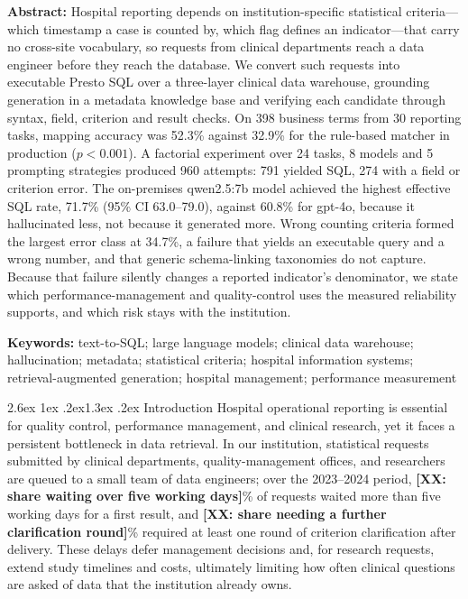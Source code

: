 \documentclass[10pt]{article}
\makeatletter
\renewcommand\section{\@startsection{section}{1}{\z@}%
  {2.6ex \@plus 1ex \@minus .2ex}{1.3ex \@plus .2ex}%
  {\normalfont\large\bfseries}}
\newcommand{\PH}[1]{{\color{red}\textbf{[#1]}}}
\makeatother
\begin{document}
\vspace{9pt}
\noindent\textbf{Abstract:}
Hospital reporting depends on institution-specific statistical
criteria---which timestamp a case is counted by, which flag defines an
indicator---that carry no cross-site vocabulary, so requests from clinical
departments reach a data engineer before they reach the database. We convert such
requests into executable Presto SQL over a three-layer clinical data warehouse,
grounding generation in a metadata knowledge base and verifying each candidate
through syntax, field, criterion and result checks. On 398 business terms from 30
reporting tasks, mapping accuracy was 52.3\% against 32.9\% for the rule-based
matcher in production ($p<0.001$). A factorial experiment over 24 tasks, 8 models
and 5 prompting strategies produced 960 attempts: 791 yielded SQL, 274 with a
field or criterion error. The
on-premises qwen2.5:7b model achieved the highest effective SQL rate, 71.7\%
(95\% CI 63.0--79.0), against 60.8\% for gpt-4o, because it hallucinated less,
not because it generated more. Wrong counting criteria formed the largest error
class at 34.7\%, a failure that yields an executable query and a wrong number,
and that generic schema-linking taxonomies do not capture. Because that failure
silently changes a reported indicator's denominator, we state which
performance-management and quality-control uses the measured reliability
supports, and which risk stays with the institution.

\vspace{6pt}
\noindent\textbf{Keywords:} text-to-SQL; large language models; clinical data warehouse;
hallucination; metadata; statistical criteria; hospital information systems;
retrieval-augmented generation; hospital management; performance measurement

\section{Introduction}
Hospital operational reporting is essential for quality control, performance
management, and clinical research, yet it faces a persistent bottleneck in data
retrieval. In our institution, statistical requests submitted by clinical
departments, quality-management offices, and researchers are queued to a small
team of data engineers; over the 2023--2024 period,
\PH{XX: share waiting over five working days}\% of requests waited more than five
working days for a first result, and \PH{XX: share needing a further clarification
round}\% required at least one round of criterion clarification after delivery. These delays defer
management decisions and, for research requests, extend study timelines and
costs, ultimately limiting how often clinical questions are asked of data that
the institution already owns.
\end{document}
